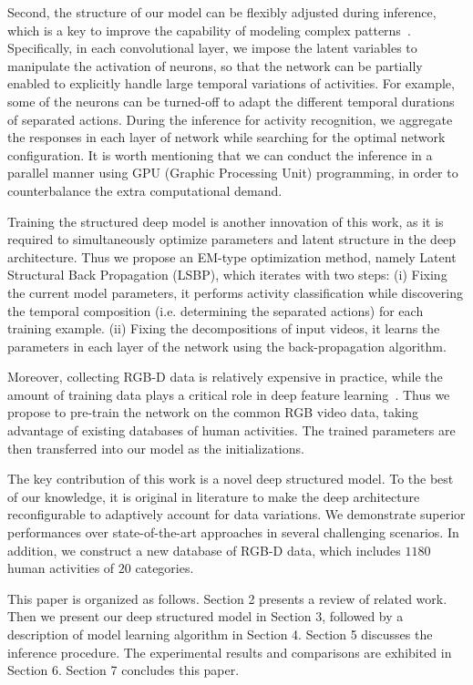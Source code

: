 \documentclass{sig-alternate}
\begin{document}
Second, the structure of our model can be flexibly adjusted during inference, which is a key to improve the capability of modeling complex patterns~\cite{AOGZhu2006,AOGICCV2011,LiangMM2013}. Specifically, in each convolutional layer, we impose the latent variables to manipulate the activation of neurons, so that the network can be partially enabled to explicitly handle large temporal variations of activities. For example, some of the neurons can be turned-off to adapt the different temporal durations of separated actions. During the inference for activity recognition, we aggregate the responses in each layer of network while searching for the optimal network configuration. It is worth mentioning that we can conduct the inference in a parallel manner using GPU (Graphic Processing Unit) programming, in order to counterbalance the extra computational demand.

Training the structured deep model is another innovation of this work, as it is required to simultaneously optimize parameters and latent structure in the deep architecture.  Thus we propose an EM-type optimization method, namely Latent Structural Back Propagation (LSBP), which iterates with two steps: (i) Fixing the current model parameters, it performs activity classification while discovering the temporal composition (i.e. determining the separated actions) for each training example. (ii) Fixing the decompositions of input videos, it learns the parameters in each layer of the network using the back-propagation algorithm.

Moreover, collecting RGB-D data is relatively expensive in practice, while the amount of training data plays a critical role in deep feature learning~\cite{ImagenetNIPS2012}. Thus we propose to pre-train the network on the common RGB video data, taking advantage of existing databases of human activities. The trained parameters are then transferred into our model as the initializations.

The key contribution of this work is a novel deep structured model. To the best of our knowledge, it is original in literature to make the deep architecture reconfigurable to adaptively account for data variations. We demonstrate superior performances over state-of-the-art approaches in several challenging scenarios. In addition, we construct a new database of RGB-D data, which includes $1180$ human activities of $20$ categories.

This paper is organized as follows. Section 2 presents a review of related work. Then we present our deep structured model in Section 3, followed by a description of model learning algorithm in Section 4. Section 5 discusses the inference procedure. The experimental results and comparisons are exhibited in Section 6. Section 7 concludes this paper.
\end{document}
